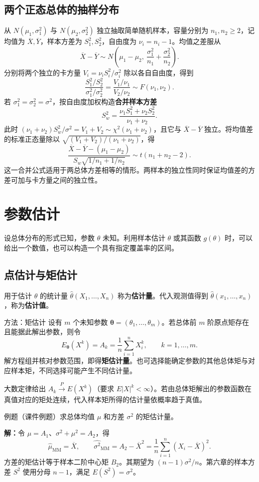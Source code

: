 \documentclass[UTF8,fontset=none,zihao=-4,a4paper]{ctexart}
\newcommand{\term}[1]{\textbf{#1}}
\newcommand{\example}[1]{\begin{infobox}{例题}#1\end{infobox}}
\newcommand{\solution}{\par\noindent\textbf{解：}}
\newcommand{\chapterpage}[1]{\clearpage\section{#1}}
\begin{document}
\subsection{两个正态总体的抽样分布}
从 $N(\mu_1,\sigma_1^2)$ 与 $N(\mu_2,\sigma_2^2)$ 独立抽取简单随机样本，容量分别为 $n_1,n_2\ge2$，记均值为 $\overline X,\overline Y$，样本方差为 $S_1^2,S_2^2$，自由度为 $\nu_i=n_i-1$。均值之差服从
\[
\overline X-\overline Y\sim N\!\left(\mu_1-\mu_2,\ \frac{\sigma_1^2}{n_1}+\frac{\sigma_2^2}{n_2}\right).
\]
分别将两个独立的卡方量 $V_i=\nu_i S_i^2/\sigma_i^2$ 除以各自自由度，得到
\[
\frac{S_1^2/S_2^2}{\sigma_1^2/\sigma_2^2}
=\frac{V_1/\nu_1}{V_2/\nu_2}\sim F(\nu_1,\nu_2).
\]
若 $\sigma_1^2=\sigma_2^2=\sigma^2$，按自由度加权构造\term{合并样本方差}
\[
S_w^2=\frac{\nu_1 S_1^2+\nu_2 S_2^2}{\nu_1+\nu_2}.
\]
此时 $(\nu_1+\nu_2)S_w^2/\sigma^2=V_1+V_2\sim\chi^2(\nu_1+\nu_2)$，且它与 $\overline X-\overline Y$ 独立。将均值差的标准正态量除以 $\sqrt{(V_1+V_2)/(\nu_1+\nu_2)}$，得
\[
\frac{\overline X-\overline Y-(\mu_1-\mu_2)}{S_w\sqrt{1/n_1+1/n_2}}\sim t(n_1+n_2-2).
\]
这一合并公式适用于两总体方差相等的情形。两样本的独立性同时保证均值差的方差可加与卡方量之间的独立性。

\chapterpage{参数估计}
设总体分布的形式已知，参数 $\theta$ 未知。利用样本估计 $\theta$ 或其函数 $g(\theta)$ 时，可以给出一个数值，也可以构造一个具有指定覆盖率的区间。

\subsection{点估计与矩估计}
用于估计 $\theta$ 的统计量 $\widehat\theta(X_1,\ldots,X_n)$ 称为\term{估计量}。代入观测值得到 $\widehat\theta(x_1,\ldots,x_n)$，称为\term{估计值}。

\begin{infobox}{方法：矩估计}
设有 $m$ 个未知参数 $\boldsymbol\theta=(\theta_1,\ldots,\theta_m)$。若总体前 $m$ 阶原点矩存在且能据此解出参数，则令
\[
E_{\boldsymbol\theta}(X^k)=A_k=\frac{1}{n}\sum_{i=1}^n X_i^k,\qquad k=1,\ldots,m.
\]
解方程组并核对参数范围，即得\term{矩估计量}。也可选择能确定参数的其他总体矩与对应样本矩，不同选择可能产生不同估计量。
\end{infobox}
大数定律给出 $A_k\xrightarrow{P}E(X^k)$（要求 $E|X|^k<\infty$）。若由总体矩解出的参数函数在真值对应的矩处连续，代入样本矩所得的估计量依概率趋于真值。

\example{（课件例题）求总体均值 $\mu$ 和方差 $\sigma^2$ 的矩估计量。}
\solution 令 $\mu=A_1$、$\sigma^2+\mu^2=A_2$，得
\[
\widehat\mu_{\mathrm{MM}}=\overline X,\qquad
\widehat{\sigma^2}_{\mathrm{MM}}=A_2-\overline X^2
=\frac{1}{n}\sum_{i=1}^n(X_i-\overline X)^2.
\]
方差的矩估计等于样本二阶中心矩 $B_2$。其期望为 $(n-1)\sigma^2/n$。第六章的样本方差 $S^2$ 使用分母 $n-1$，满足 $E(S^2)=\sigma^2$。
\end{document}

